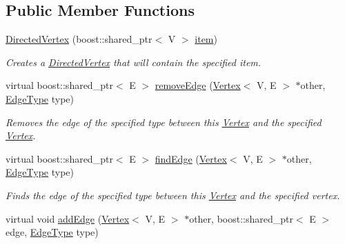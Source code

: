 \subsection*{Public Member Functions}
\begin{DoxyCompactItemize}
\item 
\hypertarget{classrepast_1_1_directed_vertex_a2f3b536bc1ffa83364808390a19706b7}{\hyperlink{classrepast_1_1_directed_vertex_a2f3b536bc1ffa83364808390a19706b7}{Directed\-Vertex} (boost\-::shared\-\_\-ptr$<$ V $>$ \hyperlink{classrepast_1_1_vertex_a55749dbe0d9f79bb39dfea7733070305}{item})}\label{classrepast_1_1_directed_vertex_a2f3b536bc1ffa83364808390a19706b7}

\begin{DoxyCompactList}\small\item\em Creates a \hyperlink{classrepast_1_1_directed_vertex}{Directed\-Vertex} that will contain the specified item. \end{DoxyCompactList}\item 
virtual boost\-::shared\-\_\-ptr$<$ E $>$ \hyperlink{classrepast_1_1_directed_vertex_ac70277c05d9dbad7bd4d876fd4c4cf5b}{remove\-Edge} (\hyperlink{classrepast_1_1_vertex}{Vertex}$<$ V, E $>$ $\ast$other, \hyperlink{classrepast_1_1_vertex_a8b4819d648c7c0dd8b0622beea77cc14}{Edge\-Type} type)
\begin{DoxyCompactList}\small\item\em Removes the edge of the specified type between this \hyperlink{classrepast_1_1_vertex}{Vertex} and the specified \hyperlink{classrepast_1_1_vertex}{Vertex}. \end{DoxyCompactList}\item 
virtual boost\-::shared\-\_\-ptr$<$ E $>$ \hyperlink{classrepast_1_1_directed_vertex_a1d366144c84a033448fbc0e5f67f8cdb}{find\-Edge} (\hyperlink{classrepast_1_1_vertex}{Vertex}$<$ V, E $>$ $\ast$other, \hyperlink{classrepast_1_1_vertex_a8b4819d648c7c0dd8b0622beea77cc14}{Edge\-Type} type)
\begin{DoxyCompactList}\small\item\em Finds the edge of the specified type between this \hyperlink{classrepast_1_1_vertex}{Vertex} and the specified vertex. \end{DoxyCompactList}\item 
virtual void \hyperlink{classrepast_1_1_directed_vertex_a6ff5f259f8e4087479bb37156b841ab2}{add\-Edge} (\hyperlink{classrepast_1_1_vertex}{Vertex}$<$ V, E $>$ $\ast$other, boost\-::shared\-\_\-ptr$<$ E $>$ edge, \hyperlink{classrepast_1_1_vertex_a8b4819d648c7c0dd8b0622beea77cc14}{Edge\-Type} type)

\end{DoxyCompactItemize}
